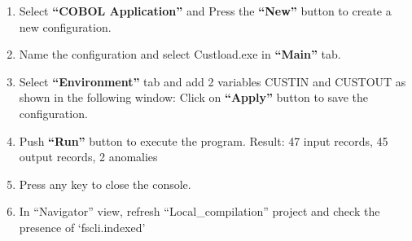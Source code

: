 \begin{enumerate}
\item Select \textbf{``COBOL Application''} and Press the \textbf{``New''} button to create a new configuration.

\item Name the configuration and select Custload.exe in \textbf{``Main''} tab.

\item Select \textbf{``Environment''} tab and add 2 variables CUSTIN and CUSTOUT as shown in the following window:
Click on \textbf{``Apply''} button to save the configuration.

\item Push \textbf{``Run''} button to execute the program.
Result: 47 input records, 45 output records, 2 anomalies

\item Press any key to close the console.

\item In ``Navigator'' view, refresh ``Local\_compilation'' project and check the presence of `fscli.indexed'

\end{enumerate}
